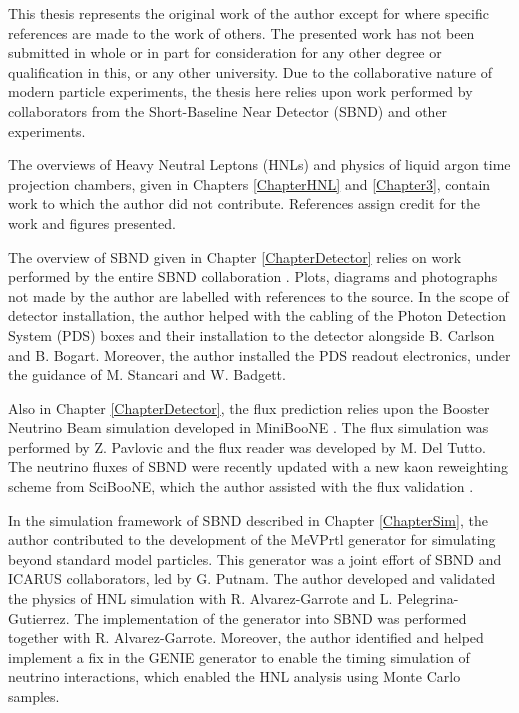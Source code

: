 
\begin{declaration}

This thesis represents the original work of the author except for where specific references are made to the work of others.
The presented work has not been submitted in whole or in part for consideration for any other degree or qualification in this, or any other university. 
Due to the collaborative nature of modern particle experiments, the thesis here relies upon work performed by collaborators from the Short-Baseline Near Detector (SBND) and other experiments.

The overviews of Heavy Neutral Leptons (HNLs) and physics of liquid argon time projection chambers, given in Chapters \ref{ChapterHNL} and \ref{Chapter3}, contain work to which the author did not contribute.
References assign credit for the work and figures presented.

The overview of SBND given in Chapter \ref{ChapterDetector} relies on work performed by the entire SBND collaboration \cite{SBNProgram,sbnd_det}.
Plots, diagrams and photographs not made by the author are labelled with references to the source.
In the scope of detector installation, the author helped with the cabling of the Photon Detection System (PDS) boxes and their installation to the detector alongside B. Carlson and B. Bogart.
Moreover, the author installed the PDS readout electronics, under the guidance of M. Stancari and W. Badgett.

Also in Chapter \ref{ChapterDetector}, the flux prediction relies upon the Booster Neutrino Beam simulation developed in MiniBooNE \cite{BNBFlux}.
The flux simulation was performed by Z. Pavlovic and the flux reader was developed by M. Del Tutto. 
The neutrino fluxes of SBND were recently updated with a new kaon reweighting scheme from SciBooNE, which the author assisted with the flux validation \cite{SciBooNE}.

In the simulation framework of SBND described in Chapter \ref{ChapterSim}, the author contributed to the development of the MeVPrtl generator for simulating beyond standard model particles.
This generator was a joint effort of SBND and ICARUS collaborators, led by G. Putnam.
The author developed and validated the physics of HNL simulation with R. Alvarez-Garrote and L. Pelegrina-Gutierrez.
The implementation of the generator into SBND was performed together with R. Alvarez-Garrote.
Moreover, the author identified and helped implement a fix in the GENIE generator to enable the timing simulation of neutrino interactions, which enabled the HNL analysis using Monte Carlo samples.


\end{declaration}
